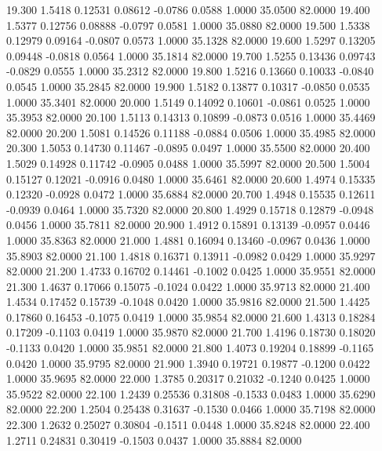   19.300   1.5418   0.12531   0.08612  -0.0786   0.0588   1.0000  35.0500  82.0000
  19.400   1.5377   0.12756   0.08888  -0.0797   0.0581   1.0000  35.0880  82.0000
  19.500   1.5338   0.12979   0.09164  -0.0807   0.0573   1.0000  35.1328  82.0000
  19.600   1.5297   0.13205   0.09448  -0.0818   0.0564   1.0000  35.1814  82.0000
  19.700   1.5255   0.13436   0.09743  -0.0829   0.0555   1.0000  35.2312  82.0000
  19.800   1.5216   0.13660   0.10033  -0.0840   0.0545   1.0000  35.2845  82.0000
  19.900   1.5182   0.13877   0.10317  -0.0850   0.0535   1.0000  35.3401  82.0000
  20.000   1.5149   0.14092   0.10601  -0.0861   0.0525   1.0000  35.3953  82.0000
  20.100   1.5113   0.14313   0.10899  -0.0873   0.0516   1.0000  35.4469  82.0000
  20.200   1.5081   0.14526   0.11188  -0.0884   0.0506   1.0000  35.4985  82.0000
  20.300   1.5053   0.14730   0.11467  -0.0895   0.0497   1.0000  35.5500  82.0000
  20.400   1.5029   0.14928   0.11742  -0.0905   0.0488   1.0000  35.5997  82.0000
  20.500   1.5004   0.15127   0.12021  -0.0916   0.0480   1.0000  35.6461  82.0000
  20.600   1.4974   0.15335   0.12320  -0.0928   0.0472   1.0000  35.6884  82.0000
  20.700   1.4948   0.15535   0.12611  -0.0939   0.0464   1.0000  35.7320  82.0000
  20.800   1.4929   0.15718   0.12879  -0.0948   0.0456   1.0000  35.7811  82.0000
  20.900   1.4912   0.15891   0.13139  -0.0957   0.0446   1.0000  35.8363  82.0000
  21.000   1.4881   0.16094   0.13460  -0.0967   0.0436   1.0000  35.8903  82.0000
  21.100   1.4818   0.16371   0.13911  -0.0982   0.0429   1.0000  35.9297  82.0000
  21.200   1.4733   0.16702   0.14461  -0.1002   0.0425   1.0000  35.9551  82.0000
  21.300   1.4637   0.17066   0.15075  -0.1024   0.0422   1.0000  35.9713  82.0000
  21.400   1.4534   0.17452   0.15739  -0.1048   0.0420   1.0000  35.9816  82.0000
  21.500   1.4425   0.17860   0.16453  -0.1075   0.0419   1.0000  35.9854  82.0000
  21.600   1.4313   0.18284   0.17209  -0.1103   0.0419   1.0000  35.9870  82.0000
  21.700   1.4196   0.18730   0.18020  -0.1133   0.0420   1.0000  35.9851  82.0000
  21.800   1.4073   0.19204   0.18899  -0.1165   0.0420   1.0000  35.9795  82.0000
  21.900   1.3940   0.19721   0.19877  -0.1200   0.0422   1.0000  35.9695  82.0000
  22.000   1.3785   0.20317   0.21032  -0.1240   0.0425   1.0000  35.9522  82.0000
  22.100   1.2439   0.25536   0.31808  -0.1533   0.0483   1.0000  35.6290  82.0000
  22.200   1.2504   0.25438   0.31637  -0.1530   0.0466   1.0000  35.7198  82.0000
  22.300   1.2632   0.25027   0.30804  -0.1511   0.0448   1.0000  35.8248  82.0000
  22.400   1.2711   0.24831   0.30419  -0.1503   0.0437   1.0000  35.8884  82.0000
